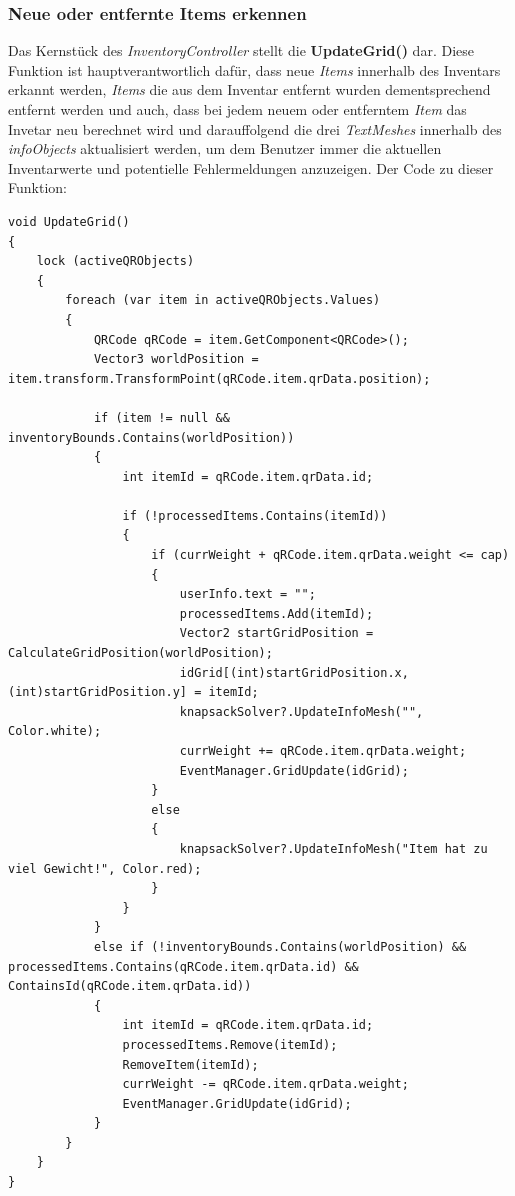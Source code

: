 \subsubsection{Neue oder entfernte Items erkennen}
Das Kernstück des \textit{InventoryController} stellt die \textbf{UpdateGrid()} dar. Diese Funktion ist hauptverantwortlich
dafür, dass neue \textit{Items} innerhalb des Inventars erkannt werden, \textit{Items} die aus dem Inventar entfernt wurden
dementsprechend entfernt werden und auch, dass bei jedem neuem oder entferntem \textit{Item} das Invetar neu berechnet
wird und darauffolgend die drei \textit{TextMeshes} innerhalb des \textit{infoObjects} aktualisiert werden, um dem Benutzer
immer  die aktuellen Inventarwerte und potentielle Fehlermeldungen anzuzeigen. Der Code zu dieser Funktion:
\begin{lstlisting}[style=csharp, caption={Neue / Entfernte Items erkennen}, label=code:controller_updateGrid]
void UpdateGrid()
{
    lock (activeQRObjects)
    {
        foreach (var item in activeQRObjects.Values)
        {
            QRCode qRCode = item.GetComponent<QRCode>();
            Vector3 worldPosition = item.transform.TransformPoint(qRCode.item.qrData.position);

            if (item != null && inventoryBounds.Contains(worldPosition))
            {
                int itemId = qRCode.item.qrData.id;

                if (!processedItems.Contains(itemId))
                {
                    if (currWeight + qRCode.item.qrData.weight <= cap)
                    {
                        userInfo.text = "";
                        processedItems.Add(itemId);
                        Vector2 startGridPosition = CalculateGridPosition(worldPosition);
                        idGrid[(int)startGridPosition.x, (int)startGridPosition.y] = itemId;
                        knapsackSolver?.UpdateInfoMesh("", Color.white);
                        currWeight += qRCode.item.qrData.weight;
                        EventManager.GridUpdate(idGrid);
                    }
                    else
                    {
                        knapsackSolver?.UpdateInfoMesh("Item hat zu viel Gewicht!", Color.red);
                    }
                }
            }
            else if (!inventoryBounds.Contains(worldPosition) && processedItems.Contains(qRCode.item.qrData.id) && ContainsId(qRCode.item.qrData.id))
            {
                int itemId = qRCode.item.qrData.id;
                processedItems.Remove(itemId);
                RemoveItem(itemId);
                currWeight -= qRCode.item.qrData.weight;
                EventManager.GridUpdate(idGrid);
            }
        }
    }
}
\end{lstlisting}\\
